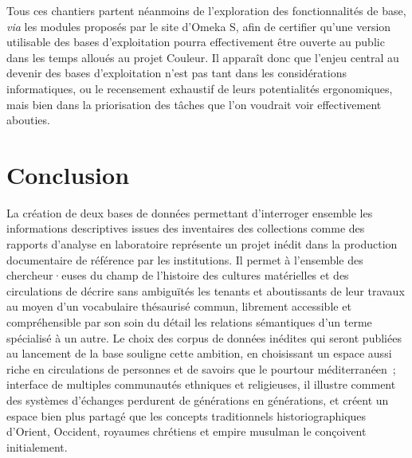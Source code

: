 \documentclass[a4paper,12pt, twoside]{book}
\begin{document}
Tous ces chantiers partent néanmoins de l’exploration des fonctionnalités de base, \textit{via} les modules proposés par le site d’Omeka S, afin de certifier qu’une version utilisable des bases d’exploitation pourra effectivement être ouverte au public dans les temps alloués au projet Couleur. Il apparaît donc que l’enjeu central au devenir des bases d’exploitation n’est pas tant dans les considérations informatiques, ou le recensement exhaustif de leurs potentialités ergonomiques, mais bien dans la priorisation des tâches que l’on voudrait voir effectivement abouties.

\clearemptydoublepage
\chapter*{Conclusion}

La création de deux bases de données permettant d’interroger ensemble les informations descriptives issues des inventaires des collections comme des rapports d’analyse en laboratoire représente un projet inédit dans la production documentaire de référence par les institutions. Il permet à l’ensemble des chercheur·euses du champ de l’histoire des cultures matérielles et des circulations de décrire sans ambiguïtés les tenants et aboutissants de leur travaux au moyen d’un vocabulaire thésaurisé commun, librement accessible et compréhensible par son soin du détail les relations sémantiques d’un terme spécialisé à un autre. Le choix des corpus de données inédites qui seront publiées au lancement de la base souligne cette ambition, en choisissant un espace aussi riche en circulations de personnes et de savoirs que le pourtour méditerranéen~; interface de multiples communautés ethniques et religieuses, il illustre comment des systèmes d’échanges perdurent de générations en générations, et créent un espace bien plus partagé que les concepts traditionnels historiographiques d’Orient, Occident, royaumes chrétiens et empire musulman le conçoivent initialement.
\end{document}
